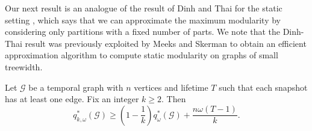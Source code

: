 \documentclass[runningheads]{llncs}
\newcommand{\cA}{\mathcal{A}}
\newcommand{\cG}{\mathcal{G}}
\newcommand{\ind}[1]{\mathbf{1}_{#1}}
\begin{document}
Our next result is an analogue of the result of Dinh and Thai for the static setting \cite[Lemma 3]{Dinh_Thai_2013}, which says that we can approximate the maximum modularity by considering only partitions with a fixed number of parts.  We note that the Dinh-Thai result was previously exploited by Meeks and Skerman \cite{w1hard} to obtain an efficient approximation algorithm to compute static modularity on graphs of small treewidth.

\begin{lemma}\label{lem:k_part_approx_bound}
Let $\cG$ be a temporal graph with $n$ vertices and lifetime $T$ such that each snapshot has at least one edge. Fix an integer $k\geq 2$. Then
\[ q^*_{k,\omega}(\cG)\geq \left(1-\frac{1}{k}\right) q^*_{\omega}(\cG) + \frac{n\omega(T-1)}{k}. \]
\end{lemma}
\end{document}
